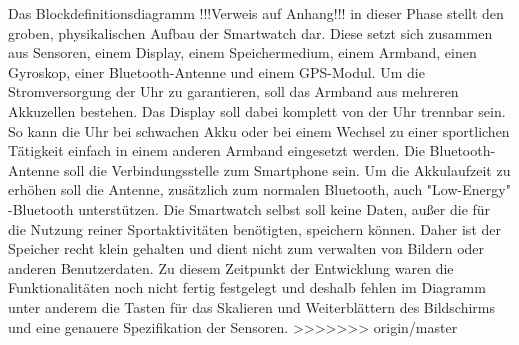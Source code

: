 Das Blockdefinitionsdiagramm !!!Verweis auf Anhang!!! in dieser Phase stellt den groben, physikalischen Aufbau der Smartwatch dar. Diese setzt sich zusammen aus Sensoren, einem Display, einem Speichermedium, einem Armband, einen Gyroskop, einer Bluetooth-Antenne und einem GPS-Modul. Um die Stromversorgung der Uhr zu garantieren, soll das Armband aus mehreren Akkuzellen bestehen. Das Display soll dabei komplett von der Uhr trennbar sein. So kann die Uhr bei schwachen Akku oder bei einem Wechsel zu einer sportlichen Tätigkeit einfach in einem anderen Armband eingesetzt werden. Die Bluetooth-Antenne soll die Verbindungsstelle zum Smartphone sein. Um die Akkulaufzeit zu erhöhen soll die Antenne, zusätzlich zum normalen Bluetooth, auch "Low-Energy" -Bluetooth unterstützen. Die Smartwatch selbst soll keine Daten, außer die für die Nutzung reiner Sportaktivitäten benötigten, speichern können. Daher ist der Speicher recht klein gehalten und dient nicht zum verwalten von Bildern oder anderen Benutzerdaten.
Zu diesem Zeitpunkt der Entwicklung waren die Funktionalitäten noch nicht fertig festgelegt und deshalb fehlen im Diagramm unter anderem die Tasten für das Skalieren und Weiterblättern des Bildschirms und eine genauere Spezifikation der Sensoren.
>>>>>>> origin/master
